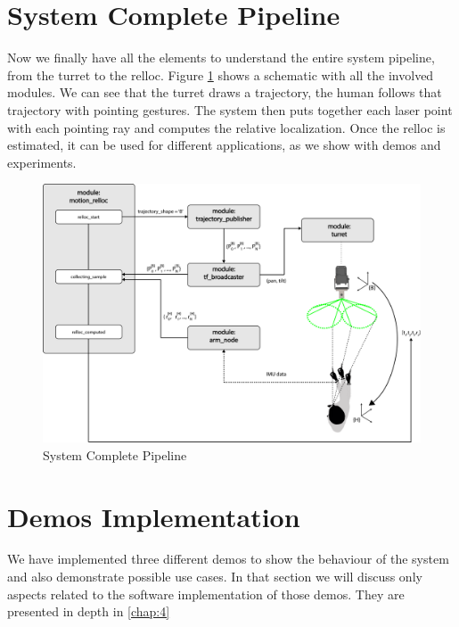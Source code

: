 \section{System Complete Pipeline}
Now we finally have all the elements to understand the entire system pipeline, from the turret to the relloc. Figure \ref{fig:systemBigPicture} shows a schematic with all the involved modules. We can see that the turret draws a trajectory, the human follows that trajectory with pointing gestures. The system then puts together each laser point with each pointing ray and computes the relative localization. Once the relloc is estimated, it can be used for different applications, as we show with demos and experiments.
\begin{figure}
	\centering
	\includegraphics[width=\textwidth]{img/systemPipeline.png}%
	\caption{System Complete Pipeline}
	\label{fig:systemBigPicture}
\end{figure}

\section{Demos Implementation}
We have implemented three different demos to show the behaviour of the system and also demonstrate possible use cases. In that section we will discuss only aspects related to the software implementation of those demos. They are presented in depth in \ref{chap:4} 

